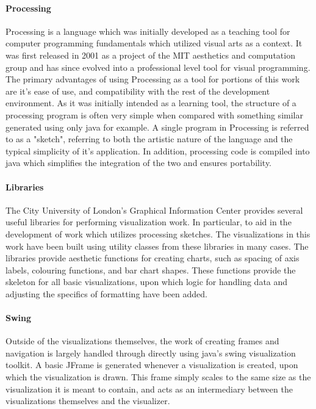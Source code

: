 \paragraph{Processing}
Processing is a language which was initially developed as a teaching tool for computer programming fundamentals which utilized visual arts as a context. It was first released in 2001 as a project of the MIT aesthetics and computation group and has since evolved into a professional level tool for visual programming. The primary advantages of using Processing as a tool for portions of this work are it's ease of use, and compatibility with the rest of the development environment. As it was initially intended as a learning tool, the structure of a processing program is often very simple when compared with something similar generated using only java for example. A single program in Processing is referred to as a "sketch", referring to both the artistic nature of the language and the typical simplicity of it's application. In addition, processing code is compiled into java which simplifies the integration of the two and ensures portability. 

\paragraph{Libraries}
The City University of London's Graphical Information Center provides several useful libraries for performing visualization work. In particular, to aid in the development of work which utilizes processing sketches. The visualizations in this work have been built using utility classes from these libraries in many cases. The libraries provide aesthetic functions for creating charts, such as spacing of axis labels, colouring functions, and bar chart shapes. These functions provide the skeleton for all basic visualizations, upon which logic for handling data and adjusting the specifics of formatting have been added.   

\paragraph{Swing}
Outside of the visualizations themselves, the work of creating frames and navigation is largely handled through directly using java's swing visualization toolkit. A basic JFrame is generated whenever a visualization is created, upon which the visualization is drawn. This frame simply scales to the same size as the visualization it is meant to contain, and acts as an intermediary between the visualizations themselves and the visualizer. 

